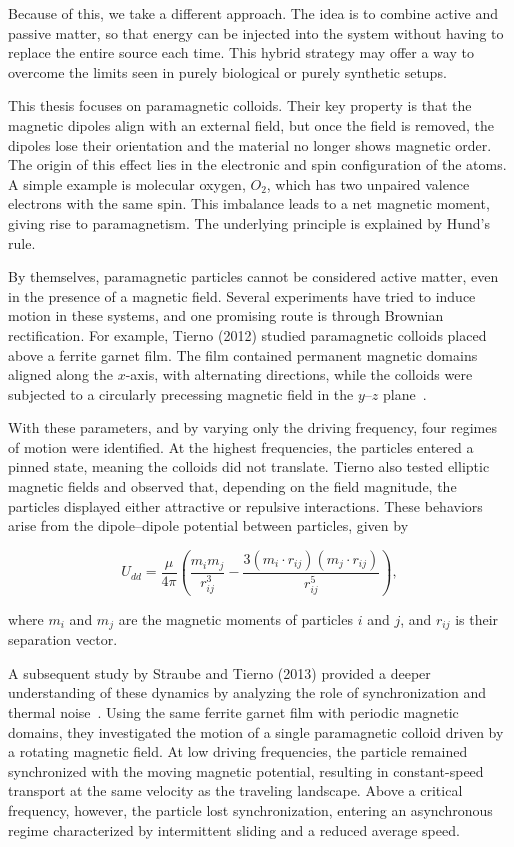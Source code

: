 Because of this, we take a different approach. The idea is to combine active and passive matter, so that energy can be injected into the system without having to replace the entire source each time. This hybrid strategy may offer a way to overcome the limits seen in purely biological or purely synthetic setups.

This thesis focuses on paramagnetic colloids. Their key property is that the magnetic dipoles align with an external field, but once the field is removed, the dipoles lose their orientation and the material no longer shows magnetic order. The origin of this effect lies in the electronic and spin configuration of the atoms. A simple example is molecular oxygen, $O_2$, which has two unpaired valence electrons with the same spin. This imbalance leads to a net magnetic moment, giving rise to paramagnetism. The underlying principle is explained by Hund’s rule.

By themselves, paramagnetic particles cannot be considered active matter, even in the presence of a magnetic field. Several experiments have tried to induce motion in these systems, and one promising route is through Brownian rectification. For example, Tierno (2012) studied paramagnetic colloids placed above a ferrite garnet film. The film contained permanent magnetic domains aligned along the $x$-axis, with alternating directions, while the colloids were subjected to a circularly precessing magnetic field in the $y$–$z$ plane~\cite{tierno2012depinning}.

With these parameters, and by varying only the driving frequency, four regimes of motion were identified. At the highest frequencies, the particles entered a pinned state, meaning the colloids did not translate. Tierno also tested elliptic magnetic fields and observed that, depending on the field magnitude, the particles displayed either attractive or repulsive interactions. These behaviors arise from the dipole–dipole potential between particles, given by

\begin{equation}
U_{dd} = \frac{\mu}{4\pi} \left( \frac{m_i m_j}{r^3_{ij}} - \frac{3(m_i \cdot r_{ij})(m_j \cdot r_{ij})}{r^5_{ij}} \right),
\label{eq:dipolepairpotential}
\end{equation}

where $m_i$ and $m_j$ are the magnetic moments of particles $i$ and $j$, and $r_{ij}$ is their separation vector.

A subsequent study by Straube and Tierno (2013) provided a deeper understanding of these dynamics by analyzing the role of synchronization and thermal noise~\cite{straube2013synchronous}. Using the same ferrite garnet film with periodic magnetic domains, they investigated the motion of a single paramagnetic colloid driven by a rotating magnetic field. At low driving frequencies, the particle remained synchronized with the moving magnetic potential, resulting in constant-speed transport at the same velocity as the traveling landscape. Above a critical frequency, however, the particle lost synchronization, entering an asynchronous regime characterized by intermittent sliding and a reduced average speed.

